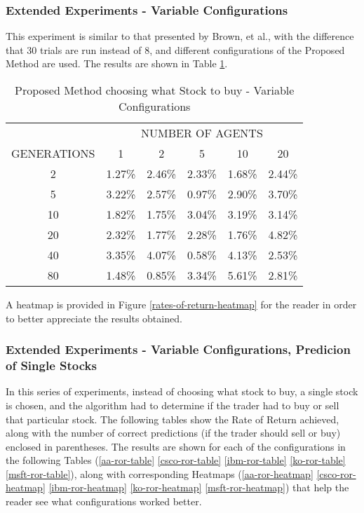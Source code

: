 \documentclass[12pt,journal,draftcls,onecolumn]{IEEEtran}
\begin{document}
\subsubsection{Extended Experiments - Variable Configurations}

This experiment is similar to that presented by Brown, et al., with the difference that 30 trials are run instead of 8, and different configurations of the Proposed Method are used. The results are shown in Table \ref{table-rates-of-return}.

\begin{table}
\caption{Proposed Method choosing what Stock to buy - Variable Configurations}
\label{table-rates-of-return}
    \begin{tabular}{ c c c c c c }
         & \multicolumn{5}{c}{NUMBER OF AGENTS} \\ 
        GENERATIONS & 1      & 2      & 5      & 10     & 20     \\
            2       & 1.27\% & 2.46\% & 2.33\% & 1.68\% & 2.44\% \\ 
            5       & 3.22\% & 2.57\% & 0.97\% & 2.90\% & 3.70\% \\ 
            10      & 1.82\% & 1.75\% & 3.04\% & 3.19\% & 3.14\% \\ 
            20      & 2.32\% & 1.77\% & 2.28\% & 1.76\% & 4.82\% \\ 
            40      & 3.35\% & 4.07\% & 0.58\% & 4.13\% & 2.53\% \\ 
            80      & 1.48\% & 0.85\% & 3.34\% & 5.61\% & 2.81\% \\ 
    \end{tabular} 
\end{table}

A heatmap is provided in Figure \ref{rates-of-return-heatmap} for the reader in order to better appreciate the results obtained.

\subsubsection{Extended Experiments - Variable Configurations, Predicion of Single Stocks}

In this series of experiments, instead of choosing what stock to buy, a single stock is chosen, and the algorithm had to determine if the trader had to buy or sell that particular stock. The following tables show the Rate of Return achieved, along with the number of correct predictions (if the trader should sell or buy) enclosed in parentheses. The results are shown for each of the configurations in the following Tables (\ref{aa-ror-table} \ref{csco-ror-table} \ref{ibm-ror-table} \ref{ko-ror-table} \ref{msft-ror-table}), along with corresponding Heatmaps (\ref{aa-ror-heatmap} \ref{csco-ror-heatmap} \ref{ibm-ror-heatmap} \ref{ko-ror-heatmap} \ref{msft-ror-heatmap}) that help the reader see what configurations worked better.
\end{document}
